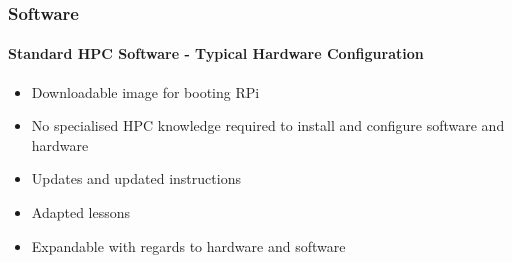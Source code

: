 \begin{frame}
	\frametitle{Software}
	\framesubtitle{Standard HPC Software - Typical Hardware Configuration}
	
	
	\begin{itemize}
		\item Downloadable image for booting RPi​
		\item No specialised HPC knowledge required to install and configure software and hardware
		\item Updates and updated instructions
		\item Adapted lessons
		\item Expandable with regards to hardware and software
	\end{itemize}
	
\end{frame}